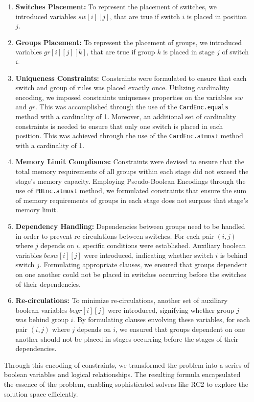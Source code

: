 \begin{enumerate}
    \item \textbf{Switches Placement:} To represent the placement of switches, we introduced variables \(sw[i][j]\), that are true if switch \(i\) is placed in position \(j\).

    \item \textbf{Groups Placement:} To represent the placement of groups, we introduced variables \(gr[i][j][k]\), that are true if group \(k\) is placed in stage \(j\) of switch \(i\).

    \item \textbf{Uniqueness Constraints:} Constraints were formulated to ensure that each switch and group of rules was placed exactly once. Utilizing cardinality encoding, we imposed constraints uniqueness properties on the variables \(sw\) and \(gr\). This was accomplished through the use of the \texttt{CardEnc.equals} method with a cardinality of 1. Moreover, an additional set of cardinality constraints is needed to ensure that only one switch is placed in each position. This was achieved through the use of the \texttt{CardEnc.atmost} method with a cardinality of 1.

    \item \textbf{Memory Limit Compliance:} Constraints were devised to ensure that the total memory requirements of all groups within each stage did not exceed the stage's memory capacity. Employing Pseudo-Boolean Encodings through the use of \texttt{PBEnc.atmost} method, we formulated constraints that ensure the sum of memory requirements of groups in each stage does not surpass that stage's memory limit.

    \item \textbf{Dependency Handling:} Dependencies between groups need to be handled in order to prevent re-circulations between switches. For each pair \((i, j)\) where \(j\) depends on \(i\), specific conditions were established. Auxiliary boolean variables \(besw[i][j]\) were introduced, indicating whether switch \(i\) is behind switch \(j\). Formulating appropriate clauses, we ensured that groups dependent on one another could not be placed in switches occurring before the switches of their dependencies.

    \item \textbf{Re-circulations:} To minimize re-circulations, another set of auxiliary boolean variables \(begr[i][j]\) were introduced, signifying whether group \(j\) was behind group \(i\). By formulating clauses envolving these variables, for each pair \((i, j)\) where \(j\) depends on \(i\), we ensured that groups dependent on one another should not be placed in stages occurring before the stages of their dependencies.
\end{enumerate}

Through this encoding of constraints, we transformed the problem into a series of boolean variables and logical relationships. The resulting formula encapsulated the essence of the problem, enabling sophisticated solvers like RC2 to explore the solution space efficiently.